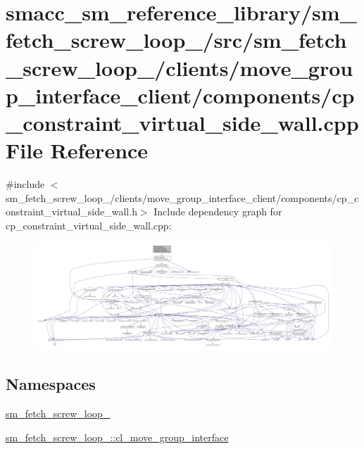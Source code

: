 \hypertarget{sm__fetch__screw__loop__1_2src_2sm__fetch__screw__loop__1_2clients_2move__group__interface__clie36fd24b5e8da3c87f2db2218c4264596}{}\section{smacc\+\_\+sm\+\_\+reference\+\_\+library/sm\+\_\+fetch\+\_\+screw\+\_\+loop\+\_/src/sm\+\_\+fetch\+\_\+screw\+\_\+loop\+\_/clients/move\+\_\+group\+\_\+interface\+\_\+client/components/cp\+\_\+constraint\+\_\+virtual\+\_\+side\+\_\+wall.cpp File Reference}
\label{sm__fetch__screw__loop__1_2src_2sm__fetch__screw__loop__1_2clients_2move__group__interface__clie36fd24b5e8da3c87f2db2218c4264596}
{\ttfamily \#include $<$sm\+\_\+fetch\+\_\+screw\+\_\+loop\+\_/clients/move\+\_\+group\+\_\+interface\+\_\+client/components/cp\+\_\+constraint\+\_\+virtual\+\_\+side\+\_\+wall.\+h$>$}\newline
Include dependency graph for cp\+\_\+constraint\+\_\+virtual\+\_\+side\+\_\+wall.\+cpp\+:
\nopagebreak
\begin{figure}[H]
\begin{center}
\leavevmode
\includegraphics[width=350pt]{sm__fetch__screw__loop__1_2src_2sm__fetch__screw__loop__1_2clients_2move__group__interface__cliecd52c0bf98fe35eb4f167910ef82bd11}
\end{center}
\end{figure}
\subsection*{Namespaces}
\begin{DoxyCompactItemize}
\item 
 \hyperlink{namespacesm__fetch__screw__loop__1}{sm\+\_\+fetch\+\_\+screw\+\_\+loop\+\_}
\item 
 \hyperlink{namespacesm__fetch__screw__loop__1_1_1cl__move__group__interface}{sm\+\_\+fetch\+\_\+screw\+\_\+loop\+\_\+::cl\+\_\+move\+\_\+group\+\_\+interface}
\end{DoxyCompactItemize}

